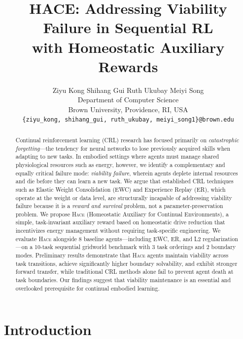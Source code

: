 \documentclass{article}
\title{HACE: Addressing Viability Failure in Sequential RL\\
with Homeostatic Auxiliary Rewards}
\author{
  Ziyu Kong \quad Shihang Gui \quad Ruth Ukubay \quad Meiyi Song \\
  Department of Computer Science \\
  Brown University, Providence, RI, USA \\
  \texttt{\{ziyu\_kong, shihang\_gui, ruth\_ukubay, meiyi\_song1\}@brown.edu}
}
\newcommand{\hace}{\textsc{Hace}}
\begin{document}
\maketitle

\begin{abstract}

Continual reinforcement learning (CRL) research has focused primarily on
\emph{catastrophic forgetting}---the tendency for neural networks to lose
previously acquired skills when adapting to new tasks. In embodied settings
where agents must manage shared physiological resources such as energy,
however, we identify a complementary and equally critical failure mode:
\emph{viability failure}, wherein agents deplete internal resources and die
before they can learn a new task. We argue that established CRL techniques
such as Elastic Weight Consolidation (EWC) and Experience Replay (ER),
which operate at the weight or data level, are structurally incapable of
addressing viability failure because it is a \emph{reward and survival}
problem, not a parameter-preservation problem. We propose \hace{}
(Homeostatic Auxiliary for Continual Environments), a simple, task-invariant
auxiliary reward based on homeostatic drive reduction that incentivizes
energy management without requiring task-specific engineering.
We evaluate \hace{} alongside 8 baseline agents---including EWC, ER, and L2
regularization---on a 10-task sequential gridworld benchmark with 3 task
orderings and 2 boundary modes. Preliminary results demonstrate that
\hace{} agents maintain viability across task transitions, achieve
significantly higher boundary solvability, and exhibit stronger forward
transfer, while traditional CRL methods alone fail to prevent agent death
at task boundaries. Our findings suggest that viability maintenance
is an essential and overlooked prerequisite for continual embodied learning.

\end{abstract}

\section{Introduction}
\label{sec:intro}
\end{document}
